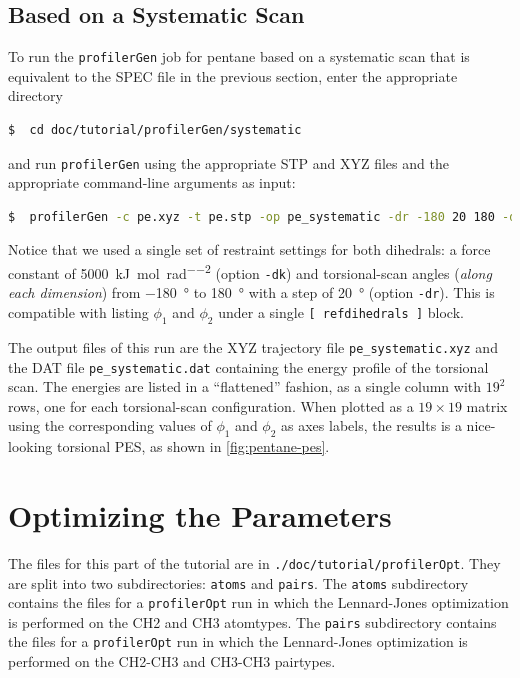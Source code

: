 \documentclass[10pt,a4paper,openany]{memoir}
\numberwithin{equation}{section}
\newcommand{\profileropt}[0]{\texttt{profilerOpt}}
\newcommand{\profilergen}[0]{\texttt{profilerGen}}
\begin{document}
\subsection{Based on a Systematic Scan}
\label{sec:tutorial-profilergen-scan}

To run the \profilergen{} job for pentane based on a systematic scan
that is equivalent to the SPEC file in the previous section, enter the
appropriate directory

\begin{lstlisting}[language=bash]
$  cd doc/tutorial/profilerGen/systematic
\end{lstlisting}\vspace{2ex}\par

\noindent
and run \profilergen{} using the appropriate STP and XYZ files and the
appropriate command-line arguments as input:

\begin{lstlisting}[language=bash]
$  profilerGen -c pe.xyz -t pe.stp -op pe_systematic -dr -180 20 180 -dk 5000
\end{lstlisting}\vspace{2ex}\par

\noindent
Notice that we used a single set of restraint settings for both
dihedrals: a force constant of
\SI{5000}{\kJ\per\mole\per\radian\squared} (option \texttt{-dk}) and
torsional-scan angles (\textit{along each dimension}) from
\SI{-180}{\degree} to \SI{180}{\degree} with a step of
\SI{20}{\degree} (option \texttt{-dr}).  This is compatible with
listing $\phi_1$ and
$\phi_2$ under a single \texttt{[~refdihedrals~]} block.

The output files of this run are the XYZ trajectory file
\texttt{pe\_systematic.xyz} and the DAT file \texttt{pe\_systematic.dat}
containing the energy profile of the torsional scan. The energies are
listed in a ``flattened'' fashion, as a single column with $19^2$
rows, one for each torsional-scan configuration. When plotted as a
$19\times 19$ matrix using the corresponding values of $\phi_1$ and
$\phi_2$ as axes labels, the results is a nice-looking torsional PES,
as shown in \autoref{fig:pentane-pes}.

\section{Optimizing the Parameters}
\label{sec:tutorial-profileropt}

The files for this part of the tutorial are in \texttt{./doc/tutorial/profilerOpt}.
They are split into two subdirectories: \texttt{atoms} and \texttt{pairs}.
The \texttt{atoms} subdirectory contains the files for a \profileropt{} run in which
the Lennard-Jones optimization is performed on the CH2 and CH3 atomtypes.
The \texttt{pairs} subdirectory contains the files for a \profileropt{} run in which
the Lennard-Jones optimization is performed on the CH2-CH3 and CH3-CH3 pairtypes.
\end{document}
